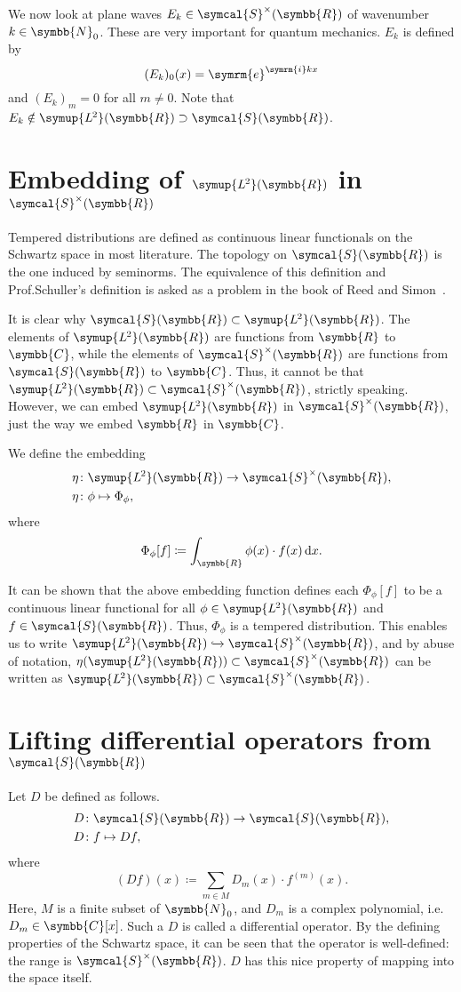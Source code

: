 \documentclass[12pt, a4 paper]{article}
\theoremstyle{definition}
\newcommand{\ltwo}{\symup{L\kern-0.5pt^2}}
\newcommand{\rr}{\symbb{R}}
\newcommand{\cc}{\symbb{C}}
\newcommand{\nn}{\symbb{N}_0}
\newcommand{\ltwor}{\ltwo(\rr)}
\newcommand{\schwartz}{\symcal{S}}
\newcommand{\schwartzr}{\schwartz(\rr)}
\newcommand{\dist}{\schwartz^\times}
\newcommand{\distr}{\dist(\rr)}
\renewcommand{\i}{\symrm{i}}
\newcommand{\e}{\symrm{e}}
\newcommand{\der}{\operatorname{d\!}{}}
\begin{document}
    We now look at plane waves $E_k \in \distr$ of wavenumber $k \in \nn$. These are very important for quantum mechanics. $E_k$ is defined by \[(E_k)_0 (x) = \e^{\i kx}\] and $(E_k)_m = 0$ for all $m \neq 0$. Note that $E_k \notin \ltwor \supset \schwartzr$.

    \section{Embedding of \texorpdfstring{\(\ltwor\)}{L²(ℝ)} in \texorpdfstring{\(\distr\)}{𝒮⁺(ℝ)}}


    Tempered distributions are defined as continuous linear functionals on the Schwartz space in most literature. The topology on $\schwartzr$ is the one induced by seminorms. The equivalence of this definition and Prof.\@ Schuller's definition is asked as a problem in the book of Reed and Simon~\cite[prob.~24, chp.~5, p.~176]{Reed}.

    It is clear why $\schwartzr \subset \ltwor$. The elements of $\ltwor$ are functions from $\rr$ to $\cc$, while the elements of $\distr$ are functions from $\schwartzr$ to $\cc$. Thus, it cannot be that $\ltwor \subset \distr$, strictly speaking. However, we can embed $\ltwor$ in $\distr$, just the way we embed $\rr$ in $\cc$.

    We define the embedding
    \begin{align*}
        \eta &\colon \ltwor \rightarrow \distr,\\
        \eta &\colon \phi \mapsto \Phi_\phi,
    \end{align*}
    where
    \[
    \Phi_\phi [f] \coloneq \int_{\rr} \phi(x) \cdot f(x) \der x.
    \]

    It can be shown that the above embedding function defines each $\Phi_\phi[f]$ to be a continuous linear functional for all $\phi \in \ltwor$ and $f \in \schwartzr$. Thus, $\Phi_\phi$ is a tempered distribution. This enables us to write $\ltwor \xhookrightarrow{} \distr$, and by abuse of notation, $\eta (\ltwor) \subset \distr$ can be written as $\ltwor \subset \distr$.

    \section{Lifting differential operators from \texorpdfstring{\(\schwartzr\)}{𝒮(ℝ)}}

    Let $D$ be defined as follows.
    \begin{align*}
        D &\colon \schwartzr \rightarrow \schwartzr,\\
        D &\colon f \mapsto Df,
    \end{align*}
    where
    \[
    (Df)(x) \coloneq \sum_{m \in M} D_m(x) \cdot f^{(m)} (x).
    \]
    Here, $M$ is a finite subset of $\nn$, and $D_m$ is a complex polynomial, i.e.\@ $D_m \in \cc[x]$. Such a $D$ is called a differential operator. By the defining properties of the Schwartz space, it can be seen that the operator is well-defined: the range is $\distr$. $D$ has this nice property of mapping into the space itself.
\end{document}
